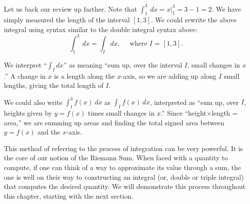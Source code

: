 Let us back our review up farther. Note that $\int_1^3\ dx = x\big|_1^3 = 3-1 = 2$. We have simply measured the length of the interval $[1,3]$. We could rewrite the above integral using syntax similar to the double integral syntax above:
\[\int_1^3\ dx = \int_Idx,\quad \text{ where $I$ = $[1,3]$}.\]

We interpret ``$\int_I dx$'' as meaning ``sum up, over the interval $I$, small changes in $x$.'' A change in $x$ is a length along the $x$-axis, so we are adding up along $I$ small lengths, giving the total length of $I$. 

We could also write $\int_1^3f(x)\ dx$ as $\int_I f(x)\ dx$, interpreted as ``sum up, over $I$, heights given by $y = f(x)$ times small changes in $x$.'' Since ``height$\times$length = area,'' we are summing up areas and finding the total signed area between $y = f(x)$ and the $x$-axis. 

This method of referring to the process of integration can be very powerful. It is the core of our notion of the Riemann Sum. When faced with a quantity to compute, if one can think of a way to approximate its value through a sum, the one is well on their way to constructing an integral (or, double or triple integral) that computes the desired quantity. We will demonstrate this process throughout this chapter, starting with the next section.
